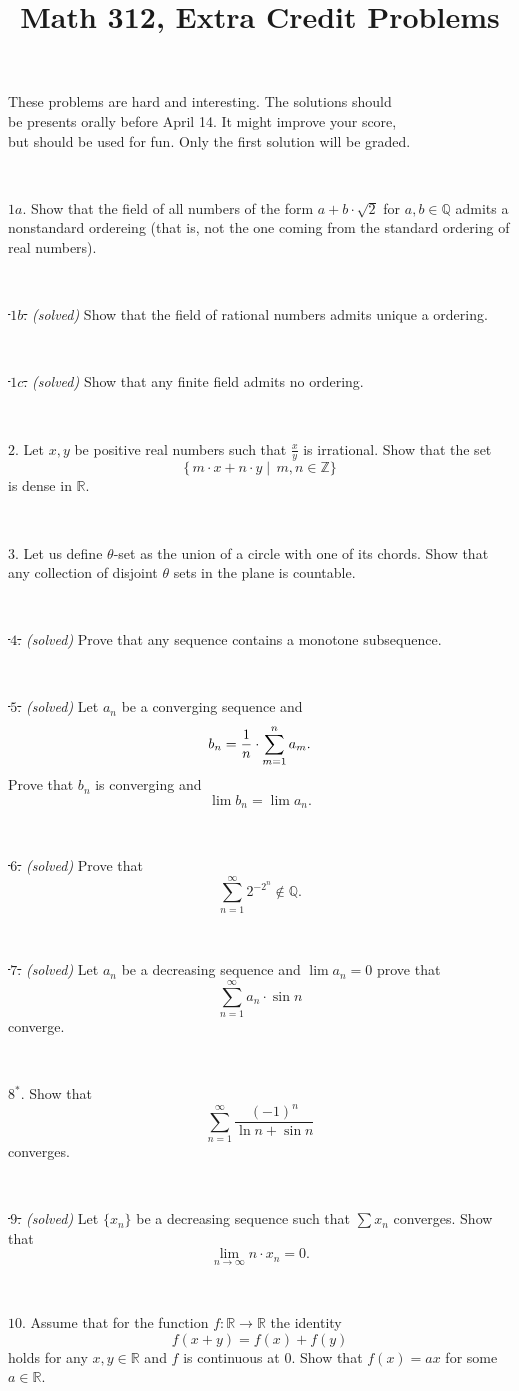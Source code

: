 \documentclass{article}
\def\noi{\noindent}%
\def\RR{\mathbb{R}}%
\def\ZZ{\mathbb{Z}}%
\def\QQ{\mathbb{Q}}%
\begin{document}
\title{Math 312, Extra Credit Problems}
\author{}
\date{}
\maketitle

\begin{center}
{\small These problems are hard and interesting. The solutions should \\
be presents orally before April 14. It might improve your score,\\
but should be used for fun. Only the first solution will be graded.}
\end{center}
\thispagestyle{empty}

\ 

\noi $1a$. Show that the field of all numbers of the form $a+b\cdot\sqrt{2}$ for $a,b\in \QQ$ admits a nonstandard ordereing (that is, not the one coming from the standard ordering of real numbers).

\ 

\noi \sout{\,$1b$.} \textit{(solved)} Show that the field of rational numbers admits unique a ordering.

\ 

\noi \sout{\,$1c$.} \textit{(solved)} Show that any finite field admits no ordering.

\ 

\noi $2$. Let $x,y$ be positive real numbers such that $\tfrac xy$ is irrational.
Show that the set 
\[\{\,m{\cdot} x+n{\cdot} y\mid\,m,n\in\ZZ\}\] 
is dense in $\RR$.

\ 

\noi $3$. Let us define $\theta$-set as the union of a circle with one of its chords.
Show that any collection of disjoint $\theta$ sets in the plane is countable.

\ 

\noi \sout{\,$4$.} \textit{(solved)}  Prove that any sequence contains a monotone subsequence.

\ 

\noi \sout{\,$5$.} \textit{(solved)} Let $a_n$ be a converging sequence and 
$$b_n={1\over n}\cdot\sum_{m=1}^n a_m.$$
Prove that $b_n$ is converging and 
$$\lim b_n=\lim a_n.$$

\ 

\noi \sout{\,$6$.} \textit{(solved)} Prove that 
$$\sum_{n=1}^\infty 2^{-2^n}\not\in \QQ.$$

\ 

\noi \sout{\,$7$.} \textit{(solved)} Let $a_n$ be a decreasing sequence and $\lim a_n=0$ prove that 
$$\sum_{n=1}^\infty  a_n\cdot\sin n$$ 
converge.

\ 

\noi $8^*\!$. Show that 
$$\sum_{n=1}^\infty  \frac{(-1)^n}{\ln n+\sin n}$$ 
converges.

\ 

\noi \sout{\,$9$.} \textit{(solved)}
Let $\{ x_n \}$ be a decreasing sequence such that $\sum x_n$ converges.
Show that 
\[\lim_{n\to\infty} n{\cdot}x_n = 0.\]

\ 

\noi $10$.
Assume that for the function $f \colon \RR \to \RR$ the identity
\[f(x+y) = f(x) + f(y)\]
holds for any $x,y\in\RR$ and $f$ is continuous at $0$.
Show that $f(x) = ax$ for some $a \in \RR$.
\end{document}
